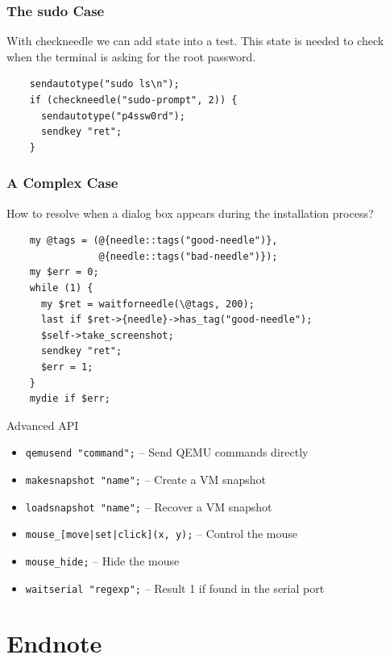 \documentclass{beamer}
\begin{document}
\begin{frame}[fragile]
  \frametitle{The sudo Case}
  With checkneedle we can add state into a test. This state is needed
  to check when the terminal is asking for the root password.
  \lstset{style=myperl}
  \begin{lstlisting}
    sendautotype("sudo ls\n");
    if (checkneedle("sudo-prompt", 2)) {
      sendautotype("p4ssw0rd");
      sendkey "ret";
    }
  \end{lstlisting}
\end{frame}

\begin{frame}[fragile]
  \frametitle{A Complex Case}
  How to resolve when a dialog box appears during the installation process?
  \lstset{style=myperl}
  \begin{lstlisting}
    my @tags = (@{needle::tags("good-needle")},
                @{needle::tags("bad-needle")});
    my $err = 0;
    while (1) {
      my $ret = waitforneedle(\@tags, 200);
      last if $ret->{needle}->has_tag("good-needle");
      $self->take_screenshot;
      sendkey "ret";
      $err = 1;
    }
    mydie if $err;
  \end{lstlisting}
\end{frame}


\begin{frame}{Advanced API}
  \begin{itemize}
  \item \texttt{qemusend "command";} -- Send QEMU commands directly
  \item \texttt{makesnapshot "name";} -- Create a VM snapshot
  \item \texttt{loadsnapshot "name";} -- Recover a VM snapshot
  \item \texttt{mouse\_[move|set|click](x, y);} -- Control the mouse
  \item \texttt{mouse\_hide;} -- Hide the mouse
  \item \texttt{waitserial "regexp";} -- Result 1 if found in the serial port
  \end{itemize}
\end{frame}


\section{Endnote}
\end{document}
